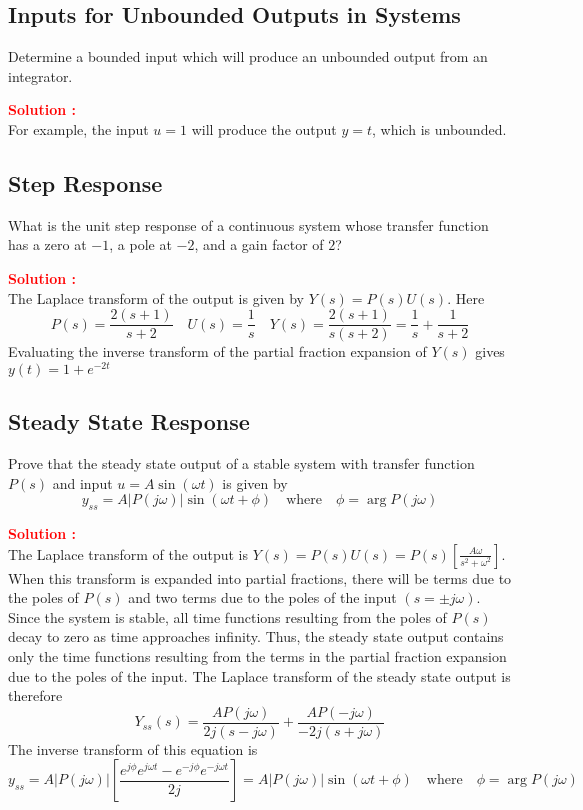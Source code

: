 \documentclass[12pt]{article}
\begin{document}
\clearpage
\subsection{Inputs for Unbounded Outputs in Systems}

Determine a bounded input which will produce an unbounded output from an integrator.

\textbf{\textcolor{red}{Solution :}} \\
For example, the input \(u = 1\) will produce the output \(y=t\), which is unbounded. 

\clearpage
\subsection{Step Response}

What is the unit step response of a continuous system whose transfer function has a zero at \(-1\), a pole at \(-2\), and a gain factor of \(2\)?

\textbf{\textcolor{red}{Solution :}} \\
The Laplace transform of the output is given by \(Y(s) = P(s) U(s)\). Here 
\begin{equation}
    P(s) = \frac{2(s+1)}{s+2} \quad U(s)  =\frac{1}{s} \quad Y(s) = \frac{2(s+1)}{s(s+2)} = \frac{1}{s} + \frac{1}{s+2}
\end{equation}
Evaluating the inverse transform of the partial fraction expansion of \(Y(s)\) gives \(y(t) = 1 + e^{-2t}\)

\clearpage
\subsection{Steady State Response}

Prove that the steady state output of a stable system with transfer function \(P(s)\) and input \(u = A \sin(\omega t)\) is given by
\[ y_{ss} = A|P(j\omega)| \sin(\omega t + \phi) \quad \text{where} \quad  \phi = \arg P(j\omega) \]

\textbf{\textcolor{red}{Solution :}} \\
The Laplace transform of the output is \(Y(s) = P(s)U(s) = P(s) \left[ \frac{A\omega}{s^2 + \omega^2} \right]\).
When this transform is expanded into partial fractions, there will be terms due to the poles of \(P(s)\) and two terms due to the poles of the input \((s = \pm j\omega)\). Since the system is stable, all time functions resulting from the poles of \(P(s)\) decay to zero as time approaches infinity. Thus, the steady state output contains only the time functions resulting from the terms in the partial fraction expansion due to the poles of the input. The Laplace transform of the steady state output is therefore
\[ Y_{ss}(s) = \frac{AP(j\omega)}{2j(s-j\omega)} + \frac{AP(-j\omega)}{-2j(s+j\omega)} \]
The inverse transform of this equation is
\[ y_{ss} = A|P(j\omega)| \left[\frac{e^{j\phi} e^{j\omega t} - e^{-j\phi} e^{-j\omega t}}{2j} \right] =  A|P(j\omega)| \sin(\omega t + \phi) \quad \text{where} \quad  \phi = \arg P(j\omega) \]
\end{document}
